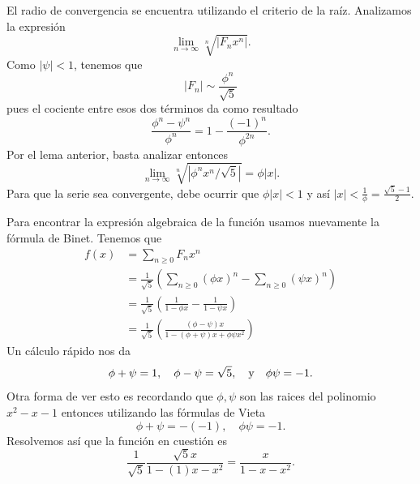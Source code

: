 \documentclass[12pt]{memoir}
\begin{document}
\begin{Ej}
    El radio de convergencia se encuentra utilizando el criterio de la raíz. Analizamos la expresión
    \[
    \lim_{n\to\infty}\sqrt[n]{|F_nx^n|}.
    \] 
    Como \(|\psi|<1\), tenemos que 
    \[
    |F_n|\sim \frac{\phi^n}{\sqrt{5}}
    \]
    pues el cociente entre esos dos términos da como resultado
    \[
    \frac{\phi^n-\psi^n}{\phi^n}=1-\frac{(-1)^n}{\phi^{2n}}.
    \]
    Por el lema anterior, basta analizar entonces
    \[
    \lim_{n\to\infty}\sqrt[n]{|\phi^nx^n/\sqrt{5}|}=\phi |x|.
    \]
    Para que la serie sea convergente, debe ocurrir que \(\phi |x|<1\) y así \(|x|<\frac{1}{\phi}=\frac{\sqrt{5}-1}{2}\).\par
    Para encontrar la expresión algebraica de la función usamos nuevamente la fórmula de Binet. Tenemos que 
    \begin{align*}
        f(x)&=\sum_{n\geq 0}F_nx^n\\
        &=\frac{1}{\sqrt{5}}\left(\sum_{n\geq 0}(\phi x)^n-\sum_{n\geq 0}(\psi x)^n\right)\\
        &=\frac{1}{\sqrt{5}}\left(\frac{1}{1-\phi x}-\frac{1}{1-\psi x}\right)\\
        &=\frac{1}{\sqrt{5}}\left(\frac{(\phi-\psi)x}{1-(\phi+\psi)x+\phi\psi x^2}\right)
    \end{align*}
    Un cálculo rápido nos da 
    \[
    \phi+\psi=1,\quad \phi-\psi=\sqrt{5},\quad\text{y}\quad\phi\psi=-1.
    \]
    Otra forma de ver esto es recordando que \(\phi,\psi\) son las raices del polinomio \(x^2-x-1\) entonces utilizando las fórmulas de Vieta
    \[
    \phi+\psi=-(-1),\quad \phi\psi=-1.
    \]
    Resolvemos así que la función en cuestión es 
    \[
    \frac{1}{\sqrt{5}}\frac{\sqrt{5}x}{1-(1)x-x^2}=\frac{x}{1-x-x^2}.
    \]
\end{Ej}
\end{document}
